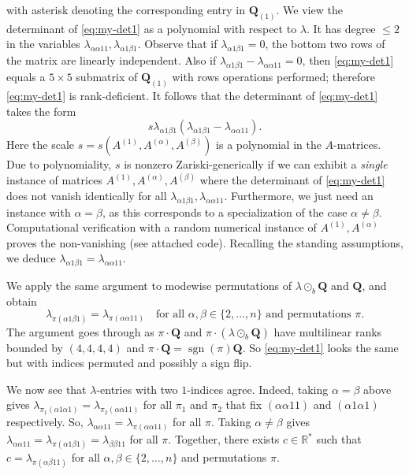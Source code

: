 \documentclass[11pt]{amsart}
\begin{document}
with asterisk denoting the corresponding entry in $\mathbf{Q}_{(1)}$. 
We view the determinant of \eqref{eq:my-det1} as a polynomial with respect to $\lambda$.
It has degree $\leq 2$ in the variables $\lambda_{\alpha \alpha 11}, \lambda_{\alpha 1 \beta 1}$. 
Observe that if $\lambda_{\alpha 1 \beta 1} = 0$, the bottom two rows of the matrix are linearly independent.  
Also if $\lambda_{\alpha 1 \beta 1} - \lambda_{\alpha \alpha 11} = 0$, then 
\eqref{eq:my-det1} equals a $5 \times 5$ submatrix of $\mathbf{Q}_{(1)}$ with rows operations performed; therefore \eqref{eq:my-det1} is rank-deficient.
It follows that the determinant of \eqref{eq:my-det1} takes the form
\begin{equation*}
s \lambda_{\alpha 1 \beta 1}(\lambda_{\alpha 1 \beta 1} - \lambda_{\alpha \alpha 1 1}).
\end{equation*}
Here the scale $s = s(A^{(1)}, A^{(\alpha)}, A^{(\beta)})$ is a polynomial in the $A$-matrices. 
Due to polynomiality, $s$ is nonzero Zariski-generically if we can exhibit a \textit{single} instance of matrices $A^{(1)}, A^{(\alpha)}, A^{(\beta)}$ where the determinant of \eqref{eq:my-det1} does not vanish identically for all $\lambda_{\alpha 1 \beta 1}, \lambda_{\alpha \alpha 1 1}$.
Furthermore, we just need an instance with $\alpha = \beta$, as this corresponds to a specialization of the case $\alpha \neq \beta$.  
Computational verification with a random numerical instance of $A^{(1)}, A^{(\alpha)}$ proves the non-vanishing (see attached code).  
Recalling the standing assumptions, we deduce 
$\lambda_{\alpha 1 \beta 1} = \lambda_{\alpha \alpha 1 1}$.


We apply the same argument to modewise permutations of $\lambda \odot_b \mathbf{Q}$ and $\mathbf{Q}$, and obtain
\begin{equation*}\label{eq:nice-1}
\lambda_{\pi(\alpha 1 \beta 1)} = \lambda_{\pi(\alpha \alpha 1 1)} \quad \text{for all } \alpha, \beta \in \{2, \dots, n\} \text{ and permutations } \pi.
\end{equation*}
The argument goes through as $\pi \cdot \mathbf{Q}$ and $\pi \cdot (\lambda \odot_b \mathbf{Q})$ have multilinear ranks bounded by $(4,4,4,4)$ and $\pi \cdot \mathbf{Q} = \operatorname{sgn}(\pi) \mathbf{Q}$.  
So \eqref{eq:my-det1} looks the same but with indices permuted and possibly a sign flip.

 
We now see that $\lambda$-entries with  two $1$-indices agree.
Indeed, taking $\alpha = \beta$ above gives $\lambda_{\pi_1(\alpha 1 \alpha 1)} = \lambda_{\pi_2(\alpha \alpha 1 1)}$ for all $\pi_1$ and $\pi_2$ that fix $(\alpha \alpha 1 1)$ and $(\alpha 1 \alpha 1)$ respectively.  
So, $\lambda_{\alpha \alpha 1 1} = \lambda_{\pi(\alpha \alpha 1 1)}$ for all $\pi$.  
Taking $\alpha \neq \beta$ gives $\lambda_{\alpha \alpha 1 1} = \lambda_{\pi(\alpha 1 \beta 1)} = \lambda_{\beta \beta 1 1}$ for all $\pi$.  
Together, there exists $c \in \mathbb{R}^*$ such that 
$c = \lambda_{\pi(\alpha \beta 1 1)}$ for all $\alpha, \beta \in \{2, \dots, n\}$ and permutations \nolinebreak $\pi$.
\end{document}
